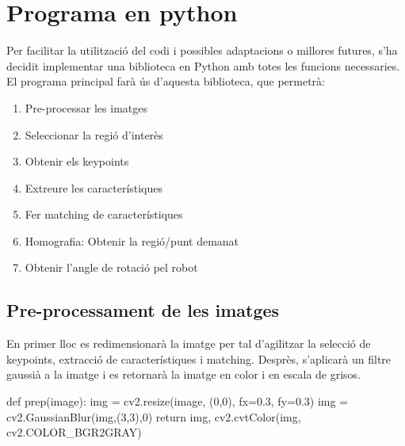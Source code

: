 \section{Programa en python}
	Per facilitar la utilització del codi i possibles adaptacions o millores futures, s'ha decidit implementar una biblioteca en Python amb totes les funcions necessaries. El programa principal farà ús
	d'aquesta biblioteca, que permetrà:
	
	\begin{enumerate}
		\item{Pre-processar les imatges}
		\item{Seleccionar la regió d'interès}
		\item{Obtenir els keypoints}
		\item{Extreure les característiques}
		\item{Fer matching de característiques}
		\item{Homografia: Obtenir la regió/punt demanat}
		\item{Obtenir l'angle de rotació pel robot}
	\end{enumerate}

	\subsection{Pre-processament de les imatges}
		En primer lloc es redimensionarà la imatge per tal d'agilitzar la selecció de keypoints, extracció de característiques i matching. Desprès, s'aplicarà un filtre gaussià
		a la imatge i es retornarà la imatge en color i en escala de grisos.\\
		\begin{python}
def prep(image):
	img = cv2.resize(image, (0,0), fx=0.3, fy=0.3)
	img = cv2.GaussianBlur(img,(3,3),0)
	return img, cv2.cvtColor(img, cv2.COLOR_BGR2GRAY)
		\end{python}
